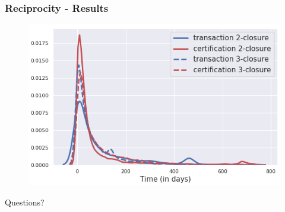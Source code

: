 \documentclass{beamer}
\begin{document}
\begin{frame}
	\frametitle{Reciprocity - \textbf{Results}}
	\begin{figure}
		\includegraphics[width=\linewidth]{./figures/triadic_closure_simple}
	\end{figure}
\end{frame}


\begin{frame}
	\Huge{\centerline{Questions?}}
\end{frame}

\end{document}
